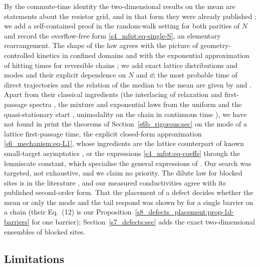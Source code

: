 By the commute-time identity the two-dimensional results on the mean are statements about the resistor grid, and in that
form they were already published \citep{CondaminBenichou2006,Wu2004,Giuggioli2020,EssamWu2009,IzmailianHuang2010,TanTan2020};
we add a self-contained proof in the random-walk setting for both parities of $N$ and record the overflow-free form
\eqref{s4_mfpt:eq-single-S}, an elementary rearrangement. The shape of the law
agrees with the picture of geometry-controlled kinetics in confined domains
\citep{Benichou2010,Meyer2011,BenichouVoituriez2014,Mattos2012,GodecMetzler2016,Grebenkov2018} and with the exponential
approximation of hitting times for reversible chains \citep{AldousBrown1992}; we add exact lattice distributions and modes
and their explicit dependence on $N$ and $\dd$; the most probable time of direct trajectories and the relation of the
median to the mean are given by \citet{GodecMetzler2016} and \citet{Grebenkov2018}. Apart from their classical
ingredients (the interlacing of relaxation and first-passage spectra \citep{HartichGodec2018,HartichGodec2019}, the
mixture and exponential laws from the uniform and the quasi-stationary start \citep{AldousFill}, unimodality on the chain
in continuous time \citep{Keilson1971}), we have not found in print the theorems of Section~\ref{s6b_rigorous:sec} on
the mode of a lattice first-passage time, the explicit closed-form approximation \eqref{s6_mechanism:eq-L1}, whose ingredients are the
lattice counterpart of known small-target asymptotics \citep{WardKeller1993,IsaacsonNewby2013}, or the expressions
\eqref{s4_mfpt:eq-coeffs} through the lemniscate constant, which specialise the general expressions of
\citet{IzmailianHuang2010}. Our search was targeted, not exhaustive, and we claim no priority. The dilute law for blocked
sites is in the literature \citep{WatsonLeath1974,Nieuwenhuizen1986,Ernst1987}, and our measured conductivities agree with
its published second-order form. That the placement of a defect decides whether the mean or only the mode and the tail
respond was shown by \citet{SarvaharmanGiuggioli2023} for a single barrier on a chain (their Eq.~(12) is our
Proposition~\ref{s8_defects_placement:prop-1d-barriers} for one barrier); Section~\ref{s7_defects:sec} adds the exact
two-dimensional ensembles of blocked sites.

\subsection{Limitations}\label{s9_discussion:ssec-limitations}

